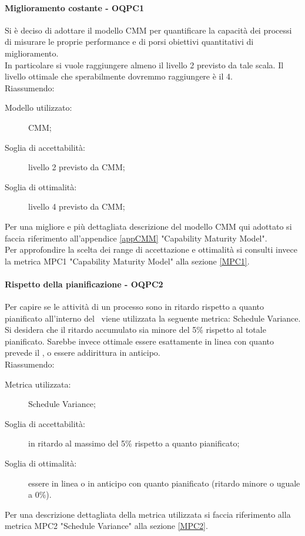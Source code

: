 \documentclass[../PianoDiQualifica.tex]{subfiles}
\begin{document}
		\paragraph{Miglioramento costante - OQPC1}
		Si è deciso di adottare il modello CMM per quantificare la capacità dei processi di misurare le proprie performance e di porsi obiettivi quantitativi di miglioramento.\\
		In particolare si vuole raggiungere almeno il livello 2 previsto da tale scala. Il livello ottimale che sperabilmente dovremmo raggiungere è il 4.\\
		Riassumendo:
		\begin{description}
			\item[Modello utilizzato:] CMM;
			\item[Soglia di accettabilità:] livello 2 previsto da CMM;
			\item[Soglia di ottimalità:] livello 4 previsto da CMM;
		\end{description}
		Per una migliore e più dettagliata descrizione del modello CMM qui adottato si faccia riferimento all'appendice \ref{appCMM} "Capability Maturity Model".\\
		Per approfondire la scelta dei range di accettazione e ottimalità si consulti invece la metrica MPC1 "Capability Maturity Model" alla sezione \ref{MPC1}.
		
		\paragraph{Rispetto della pianificazione - OQPC2}
		Per capire se le attività di un processo sono in ritardo rispetto a quanto pianificato all’interno del \pianodiprogetto\ viene utilizzata la seguente metrica: Schedule Variance.\\
		Si desidera che il ritardo accumulato sia minore del 5\% rispetto al totale pianificato. Sarebbe invece ottimale essere esattamente in linea con quanto prevede il \pianodiprogetto, o essere addirittura in anticipo.\\
		Riassumendo:
		\begin{description}
			\item[Metrica utilizzata:] Schedule Variance;
			\item[Soglia di accettabilità:] in ritardo al massimo del 5\% rispetto a quanto pianificato;
			\item[Soglia di ottimalità:] essere in linea o in anticipo con quanto pianificato (ritardo minore o uguale a 0\%).
		\end{description}
		Per una descrizione dettagliata della metrica utilizzata si faccia riferimento alla metrica MPC2 "Schedule Variance" alla sezione \ref{MPC2}.
		
\end{document}
